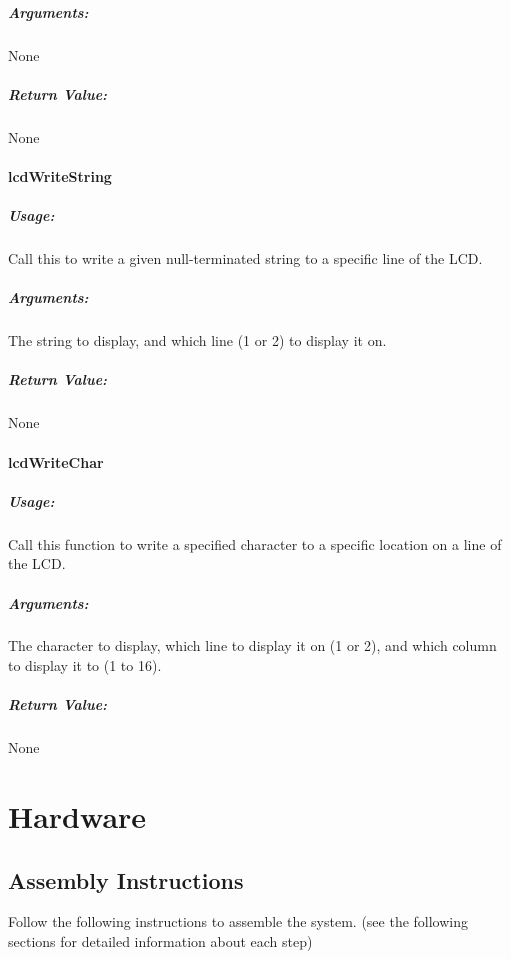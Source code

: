 \documentclass[]{report}
\begin{document}
\subsubsection{Arguments:}
None
\subsubsection{Return Value:}
None

\subsection{lcdWriteString}
\subsubsection{Usage:}
Call this to write a given null-terminated string to a specific line of the LCD.
\subsubsection{Arguments:}
The string to display, and which line (1 or 2) to display it on.
\subsubsection{Return Value:}
None

\subsection{lcdWriteChar}
\subsubsection{Usage:}
Call this function to write a specified character to a specific location on a line of the LCD.
\subsubsection{Arguments:}
The character to display, which line to display it on (1 or 2), and which column to display it to (1 to 16).
\subsubsection{Return Value:}
None

\part{Hardware}
\chapter{Assembly Instructions}
Follow the following instructions to assemble the system. (see the following sections for detailed information about each step)
\end{document}
